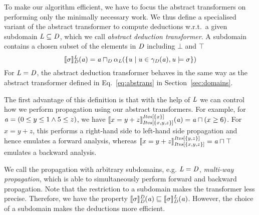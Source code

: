 To make our algorithm efficient, we have to focus the abstract
transformers on performing only the minimally necessary
work. 
%
We thus define a specialised variant of the abstract transformer to compute
deductions w.r.t.\ a given subdomain $\subdomain\subseteq \domain$,
which we call \emph{abstract deduction transformer}.
%
A subdomain contains a chosen subset of the elements in $\domain$ including $\bot$ and $\top$
\begin{equation}\label{eq:at2}
\abstrans{\domain}{\constraint}^\subdomain(\absval)=\absval\meet_\domain \alpha_\subdomain(\{\val\mid \val\in\gamma_\domain(\absval), \val\models \constraint\})
\end{equation}
For $\subdomain=\domain$, the abstract deduction transformer behaves in the same way as the abstract transformer defined in Eq.~\ref{eq:abstrans} in Section~\ref{sec:domains}.

%

The first advantage of this definition is that with the help of $\subdomain$
we can control how we perform propagation using our abstract transformers.
%
For example, for $\absval=(0\leq y \leq 1 \wedge 5\leq z)$, we have
$\abstrans{\intervals[\{x,y,z\}]}{x=y+z}^{\intervals[\{x\}]}(\absval)=\absval\meet(x\geq
6)$. For $x=y+z$, this performs a right-hand side to left-hand side propagation and
hence emulates a forward analysis, whereas
$\abstrans{\intervals[\{x,y,z\}]}{x=y+z}^{\intervals[\{y,z\}]}=\absval\meet\top$
emulates a backward analysis.

We call the propagation with arbitrary subdomains,
e.g. $\subdomain=\domain$, \emph{multi-way propagation}, which is able
to simultaneously perform forward and backward propagation.
%
Note that the restriction to a subdomain makes the transformer less
precise. Therefore, we have the property
$\abstrans{\domain}{\constraint}^\domain(\absval)\sqsubseteq
\abstrans{\domain}{\constraint}^\subdomain(\absval)$.
However, the choice of a subdomain makes the deductions more efficient.

